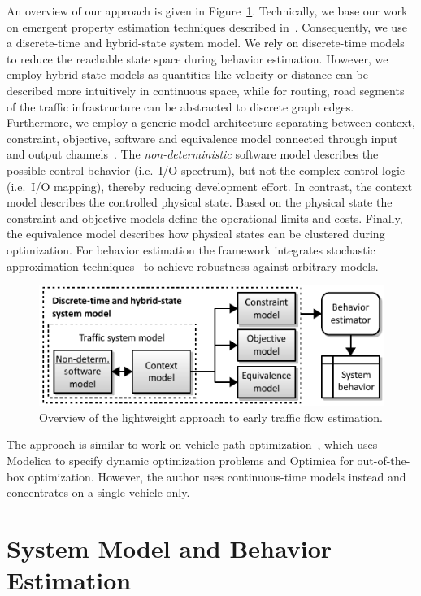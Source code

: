 \documentclass[conference]{../cls/IEEEtran}
\begin{document}
An overview of our approach is given in Figure~\ref{fig:framework}. Technically, we base our work on emergent property estimation techniques described in~\cite{Hackenberg2012}. Consequently, we use a discrete-time and hybrid-state system model. We rely on discrete-time models to reduce the reachable state space during behavior estimation. However, we employ hybrid-state models as quantities like velocity or distance can be described more intuitively in continuous space, while for routing, road segments of the traffic infrastructure can be abstracted to discrete graph edges. Furthermore, we employ a generic model architecture separating between context, constraint, objective, software and equivalence model connected through input and output channels~\cite{Hackenberg2014}. The \textit{non-deterministic} software model describes the possible control behavior (i.e.\ I/O spectrum), but not the complex control logic (i.e.\ I/O mapping), thereby reducing development effort. In contrast, the context model describes the controlled physical state. Based on the physical state the constraint and objective models define the operational limits and costs. Finally, the equivalence model describes how physical states can be clustered during optimization. For behavior estimation the framework integrates stochastic approximation techniques~\cite{Pereira1991} to achieve robustness against arbitrary models.

\begin{figure}[h]
	\centering
	\includegraphics{../gfx/framework.pdf}
	\caption{Overview of the lightweight approach to early traffic flow estimation.}
	\label{fig:framework}
\end{figure}

The approach is similar to work on vehicle path optimization~\cite{Danielsson2007}, which uses Modelica to specify dynamic optimization problems and Optimica for out-of-the-box optimization. However, the author uses continuous-time models instead and concentrates on a single vehicle only.

\section{System Model and Behavior Estimation}
\end{document}
